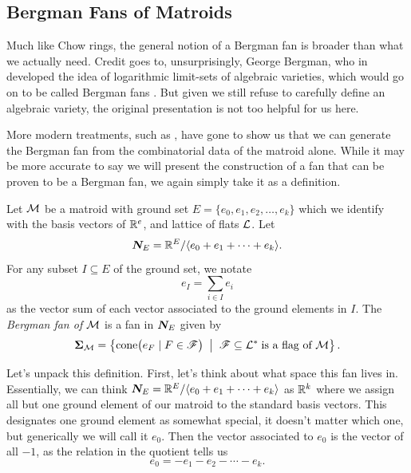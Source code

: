 \documentclass[12pt,oneside]{../../sfsuthesis}
\begin{document}
\subsection{Bergman Fans of Matroids}
Much like Chow rings, the general notion of a Bergman fan is broader than what we actually need.
Credit goes to, unsurprisingly, George Bergman, who in \cite{bergmanLogarithmicLimitsetAlgebraic1971} developed the idea of logarithmic limit-sets of algebraic varieties, which would go on to be called Bergman fans \cite{feichtnerMatroidPolytopesNested2005}.
But given we still refuse to carefully define an algebraic variety, the original presentation is not too helpful for us here.

More modern treatments, such as \cite{ardilaBergmanComplexMatroid2006,huhLogconcavityCharacteristicPolynomials2012}, have gone to show us that we can generate the Bergman fan from the combinatorial data of the matroid alone.
While it may be more accurate to say we will present the construction of a fan that can be proven to be a Bergman fan, we again simply take it as a definition.

\begin{definition}\th\label{def:bergmanFan}
    Let \( \mathcal{M} \) be a matroid with ground set \( E = \{ e_0, e_1, e_2, \dots, e_k \} \) which we identify with the basis vectors of \( \mathbb{R}^e \), and lattice of flats \( \mathcal{L} \).
    Let
    \[
        \bm{N}_E = \mathbb{R}^{E}/\langle e_0 + e_1 + \cdots + e_k \rangle.
    \]
    For any subset \( I \subseteq E \) of the ground set, we notate
    \[
        e_I = \sum_{i \in I} e_i
    \]
    as the vector sum of each vector associated to the ground elements in \( I \).
    The \emph{Bergman fan of \( \mathcal{M} \)} is a fan in \( \bm{N}_E \) given by
    \[
        {\bm{\Sigma}}_{\mathcal{M}} = \left\{
        \mathrm{cone}\big( e_F \; | \; F \in \mathscr{F} \big)
        \;\; \middle| \;\;
        \mathscr{F} \subseteq \mathcal{L}^\ast \; \text{is a flag of \(\mathcal{M}\)}
        \right\}.
    \]
\end{definition}

Let's unpack this definition.
First, let's think about what space this fan lives in.
Essentially, we can think \( \bm{N}_E = \mathbb{R}^{E}/\langle e_0 + e_1 + \cdots + e_k \rangle \) as \( \mathbb{R}^k \) where we assign all but one ground element of our matroid to the standard basis vectors.
This designates one ground element as somewhat special, it doesn't matter which one, but generically we will call it \( e_0 \).
Then the vector associated to \( e_0 \) is the vector of all \( -1 \), as the relation in the quotient tells us
\[
    e_0 = -e_1 - e_2 - \cdots - e_k.
\]
\end{document}
